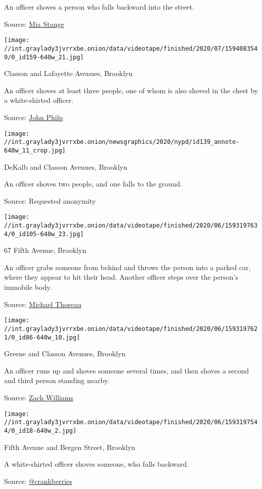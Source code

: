  An officer shoves a person who falls backward into the street.

Source:
\href{https://twitter.com/mfstange/status/1266564340381036544}{Mia
Stange}

\texttt{[image: //int.graylady3jvrrxbe.onion/data/videotape/finished/2020/07/1594083549/0\_id159-640w\_21.jpg]}

 Classon and Lafayette Avenues, Brooklyn

 An officer shoves at least three people, one of whom is also shoved in
the chest by a white-shirted officer.

Source:
\href{https://twitter.com/JohnPhilpNY/status/1266595992427790338}{John
Philp}

\texttt{[image: //int.graylady3jvrrxbe.onion/newsgraphics/2020/nypd/id139\_annote-640w\_11\_crop.jpg]}

 DeKalb and Classon Avenues, Brooklyn

 An officer shoves two people, and one falls to the ground.

Source: Requested anonymity

\texttt{[image: //int.graylady3jvrrxbe.onion/data/videotape/finished/2020/06/1593197634/0\_id105-640w\_23.jpg]}

 67 Fifth Avenue, Brooklyn

 An officer grabs someone from behind and throws the person into a
parked car, where they appear to hit their head. Another officer steps
over the person's immobile body.

Source:
\href{https://twitter.com/AnonymousBrook2/status/1266589590250553345}{Michael
Thoreau}

\texttt{[image: //int.graylady3jvrrxbe.onion/data/videotape/finished/2020/06/1593197621/0\_id86-640w\_10.jpg]}

 Greene and Classon Avenues, Brooklyn

 An officer runs up and shoves someone several times, and then shoves a
second and third person standing nearby.

Source:
\href{https://twitter.com/ZachReports/status/1266557305107202049}{Zach
Williams}

\texttt{[image: //int.graylady3jvrrxbe.onion/data/videotape/finished/2020/06/1593197544/0\_id18-640w\_2.jpg]}

 Fifth Avenue and Bergen Street, Brooklyn

 A white-shirted officer shoves someone, who falls backward.

Source:
\href{https://twitter.com/crankberries/status/1266584559245803522}{@crankberries}

